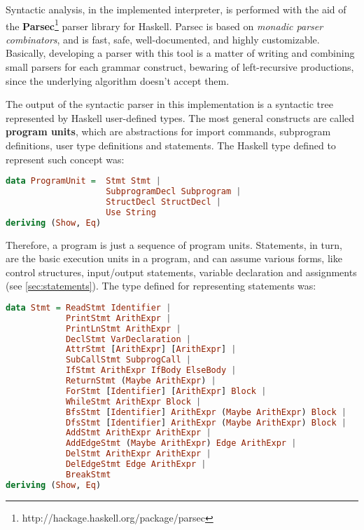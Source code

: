 Syntactic analysis, in the implemented interpreter, is performed
with the aid of the \textbf{Parsec}\footnote{http://hackage.haskell.org/package/parsec} 
parser library for Haskell.
Parsec is based on \emph{monadic parser combinators}, and is
fast, safe, well-documented, and highly customizable. Basically,
developing a parser with this tool is a matter of writing and combining small parsers
for each grammar construct, bewaring of left-recursive
productions, since the underlying algorithm doesn't 
accept them.

The output of the syntactic parser in this implementation is a syntactic tree
represented by Haskell user-defined types. The most general constructs are called
\textbf{program units}, which are abstractions for import commands, subprogram definitions,
user type definitions and statements. The Haskell type defined to represent such
concept was:

\begin{lstlisting}[language=Haskell,basicstyle=\footnotesize]
data ProgramUnit =  Stmt Stmt | 
                    SubprogramDecl Subprogram |
                    StructDecl StructDecl |
                    Use String 
deriving (Show, Eq)
\end{lstlisting}

Therefore, a program is just a sequence of program units. Statements, in turn,
are the basic execution units in a program, and can assume various forms,
like control structures, input/output statements, variable declaration and
assignments (see \ref{sec:statements}). The type defined for representing statements was:

\begin{lstlisting}[language=Haskell,basicstyle=\footnotesize]
data Stmt = ReadStmt Identifier | 
            PrintStmt ArithExpr | 
            PrintLnStmt ArithExpr | 
            DeclStmt VarDeclaration | 
            AttrStmt [ArithExpr] [ArithExpr] |
            SubCallStmt SubprogCall |
            IfStmt ArithExpr IfBody ElseBody |
            ReturnStmt (Maybe ArithExpr) |
            ForStmt [Identifier] [ArithExpr] Block |
            WhileStmt ArithExpr Block |
            BfsStmt [Identifier] ArithExpr (Maybe ArithExpr) Block |
            DfsStmt [Identifier] ArithExpr (Maybe ArithExpr) Block |
            AddStmt ArithExpr ArithExpr |
            AddEdgeStmt (Maybe ArithExpr) Edge ArithExpr |
            DelStmt ArithExpr ArithExpr |
            DelEdgeStmt Edge ArithExpr |
            BreakStmt 
deriving (Show, Eq) 
\end{lstlisting}

